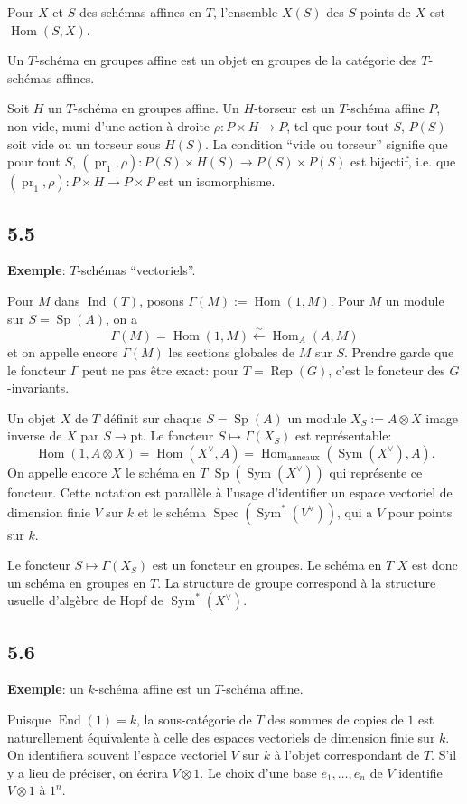 \documentclass[12pt,a4paper]{article}
\theoremstyle{plain}
\theoremstyle{definition}
\theoremstyle{remark}
\DeclareMathOperator{\Hom}{Hom}
\DeclareMathOperator{\End}{End}
\DeclareMathOperator{\Spec}{Spec}
\DeclareMathOperator{\Ind}{Ind}
\DeclareMathOperator{\Rep}{Rep}
\DeclareMathOperator{\Sym}{Sym}
\DeclareMathOperator{\Sp}{Sp}
\DeclareMathOperator{\pr}{pr}
\newcommand{\pt}{\mathrm{pt}}
\begin{document}
Pour $X$ et $S$ des schémas affines en $T$, l'ensemble $X(S)$ des $S$-points de $X$ est $\Hom(S,X)$.

Un $T$-schéma en groupes affine est un objet en groupes de la catégorie des $T$-schémas affines.

Soit $H$ un $T$-schéma en groupes affine. Un $H$-torseur est un $T$-schéma affine $P$, non vide, muni d'une action à droite $\rho: P 
\times H 
\to P$, tel que pour tout $S$, $P(S)$ soit vide ou un torseur sous $H(S)$. La condition ``vide ou torseur'' signifie que pour tout $S$, $(\pr_1, 
\rho): P(S) 
\times H(S) 
\to P(S) 
\times P(S)$ est bijectif, i.e. que $(\pr_1, 
\rho): P 
\times H 
\to P 
\times P$ est un isomorphisme.

\subsection*{5.5}
\textbf{Exemple}: $T$-schémas ``vectoriels''.

Pour $M$ dans $\Ind(T)$, posons $\Gamma(M) := 
\Hom(1,M)$. Pour $M$ un module sur $S = 
\Sp(A)$, on a
\[
\Gamma(M) = 
\Hom(1,M) 
\xleftarrow{\sim} 
\Hom_A(A,M)
\]
et on appelle encore $\Gamma(M)$ les sections globales de $M$ sur $S$. Prendre garde que le foncteur $\Gamma$ peut ne pas être exact: pour $T = 
\Rep(G)$, c'est le foncteur des $G$-invariants.

Un objet $X$ de $T$ définit sur chaque $S = 
\Sp(A)$ un module $X_S := A 
\otimes X$ image inverse de $X$ par $S 
\to 
\pt$. Le foncteur $S 
\mapsto 
\Gamma(X_S)$ est représentable:
\[
\Hom(1, A 
\otimes X) = 
\Hom(X^\vee, A) = 
\Hom_{\text{anneaux}}(\Sym(X^\vee), A).
\]
On appelle encore $X$ le schéma en $T$ $\Sp(\Sym(X^\vee))$ qui représente ce foncteur. Cette notation est parallèle à l'usage d'identifier un espace vectoriel de dimension finie $V$ sur $k$ et le schéma $\Spec(\Sym^*(V^\vee))$, qui a $V$ pour points sur $k$.

Le foncteur $S 
\mapsto 
\Gamma(X_S)$ est un foncteur en groupes. Le schéma en $T$ $X$ est donc un schéma en groupes en $T$. La structure de groupe correspond à la structure usuelle d'algèbre de Hopf de $\Sym^*(X^\vee)$.

\subsection*{5.6}
\textbf{Exemple}: un $k$-schéma affine est un $T$-schéma affine.

Puisque $\End(1) = k$, la sous-catégorie de $T$ des sommes de copies de $1$ est naturellement équivalente à celle des espaces vectoriels de dimension finie sur $k$. On identifiera souvent l'espace vectoriel $V$ sur $k$ à l'objet correspondant de $T$. S'il y a lieu de préciser, on écrira $V 
\otimes 1$. Le choix d'une base $e_1,\ldots,e_n$ de $V$ identifie $V 
\otimes 1$ à $1^n$.
\end{document}

